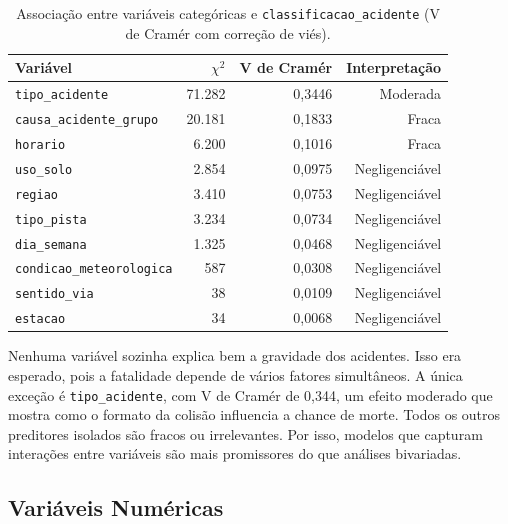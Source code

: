 \documentclass[12pt]{article}
\begin{document}
\begin{table}[ht]
\centering
\caption{Associação entre variáveis categóricas e
  \texttt{classificacao\_acidente} (V de Cramér com correção de viés).}
\label{tab:cramers_v}
\small
\begin{tabular}{lrrr}
\toprule
\textbf{Variável} & $\chi^2$ & \textbf{V de Cramér} &
  \textbf{Interpretação} \\
\midrule
\texttt{tipo\_acidente}         & 71.282 & 0,3446 & Moderada     \\
\texttt{causa\_acidente\_grupo} & 20.181 & 0,1833 & Fraca        \\
\texttt{horario}                &  6.200 & 0,1016 & Fraca        \\
\texttt{uso\_solo}              &  2.854 & 0,0975 & Negligenciável \\
\texttt{regiao}                 &  3.410 & 0,0753 & Negligenciável \\
\texttt{tipo\_pista}            &  3.234 & 0,0734 & Negligenciável \\
\texttt{dia\_semana}            &  1.325 & 0,0468 & Negligenciável \\
\texttt{condicao\_meteorologica}&    587 & 0,0308 & Negligenciável \\
\texttt{sentido\_via}           &     38 & 0,0109 & Negligenciável \\
\texttt{estacao}                &     34 & 0,0068 & Negligenciável \\
\bottomrule
\end{tabular}
\end{table}

Nenhuma variável sozinha explica bem a gravidade dos acidentes.
Isso era esperado, pois a fatalidade depende de vários fatores
simultâneos. A única exceção é \texttt{tipo\_acidente}, com
V de Cramér de 0,344, um efeito moderado que mostra como o formato
da colisão influencia a chance de morte. Todos os outros preditores
isolados são fracos ou irrelevantes. Por isso, modelos que capturam
interações entre variáveis são mais promissores do que análises
bivariadas.

\subsection{Variáveis Numéricas}
\end{document}
